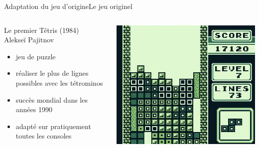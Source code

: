 \documentclass[french]{beamer}
\begin{document}
\begin{frame}{Adaptation du jeu d'origine}{Le jeu originel}
	
	\begin{columns}

		\begin{column}{0.5\textwidth}

			\begin{block}{Le premier Tétris (1984) \\Alekseï Pajitnov}
				\begin{itemize}
					\item jeu de puzzle
					\item réaliser le plus de lignes possibles avec les tétrominos
					\item succès mondial dans les années 1990
					\item adapté sur pratiquement toutes les consoles
				\end{itemize}

			\end{block}

		\end{column}

		\begin{column}{0.4\textwidth}
				\begin{center}
					\includegraphics[scale=0.25]{img/Tetris8.jpg}
				\end{center}
		\end{column}

	\end{columns}
\end{frame}
\end{document}
